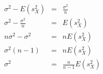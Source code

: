 \begin{eqnarray*}
	\sigma^2 - E(s_X^2) &=& \frac{\sigma^2}{n}\\
	\sigma^2 - \frac{\sigma^2}{n} &=& E(s_X^2)\\
	n\sigma^2-\sigma^2 &=& nE(s_X^2)\\
	\sigma^2(n-1)&=& nE(s_X^2)\\
	\sigma^2 &=& \frac{n}{n-1}E(s_X^2)
\end{eqnarray*}
